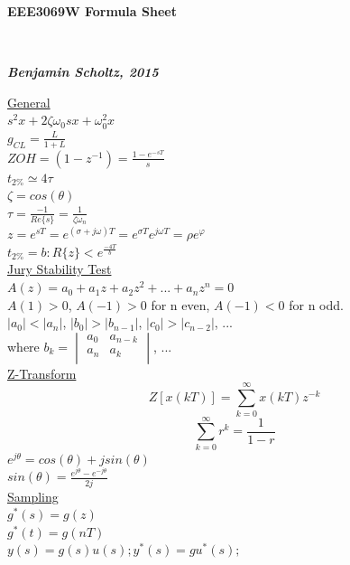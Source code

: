 \documentclass[a4paper, 10pt, titlepage]{article}
\begin{document}
\begin{center}
\begin{LARGE}
\textbf{EEE3069W Formula Sheet}
\end{LARGE} \\ \medskip
\begin{small}
\textit{\textbf{Benjamin Scholtz, 2015}}
\end{small}
\end{center}



\begin{paracol}{3}[]
\underline{General} \\
$s^2x + 2 \zeta \omega_0sx + \omega_0^2x$ \\
$g_{CL} = \frac{L}{1+L}$ \\
$ZOH = (1-z^{-1}) = \frac{1 - e^{-sT}}{s}$ \\
$t_{2\%} \simeq 4\tau$ \\
$\zeta = cos(\theta)$ \\
$\tau = \frac{-1}{Re\{s\}} = \frac{1}{\zeta \omega_n}$ \\
$z=e^{sT}=e^{(\sigma + j \omega) T} = e^{\sigma T} e^{j \omega T} = \rho e^\varphi$\\
$t_{2\%}=b:R\{z\}<e^{\frac{-4T}{b}}$\\
\underline{Jury Stability Test} \\
$A(z) = a_0 + a_1z + a_2z^2 + ... + a_nz^n = 0$ \\
$A(1)>0$, $A(-1)>0$ for n even, $A(-1)<0$ for n odd. \\
$|a_0|<|a_n|$, $|b_0|>|b_{n-1}|$, $|c_0|>|c_{n-2}|$, ... \\
where $b_k = \begin{vmatrix}
a_0 & a_{n-k}\\
a_n & a_k\\
\end{vmatrix}$, ... \\
\underline{Z-Transform}
$$Z[x(kT)] = \sum^{\infty}_{k=0} x(kT)z^{-k}$$ 
$$\sum^{\infty}_{k=0} r^k = \frac{1}{1-r}$$
$e^{j\theta} = cos(\theta) + jsin(\theta)$ \\
$sin(\theta) = \frac{e^{j\theta} - e^{-j\theta}}{2j}$ \\
\underline{Sampling} \\
$g^*(s) = g(z)$ \\
$g^*(t) = g(nT)$ \\
$y(s)=g(s)u(s);y^*(s)=gu^*(s);$\\

\end{paracol}
\end{document}
